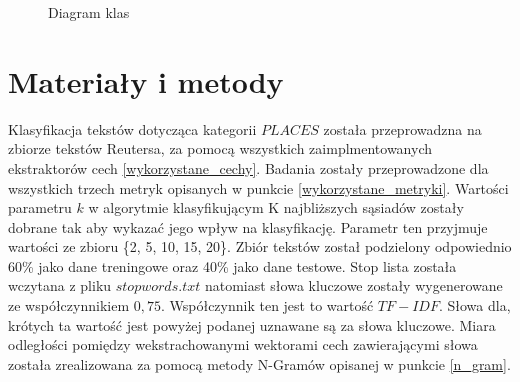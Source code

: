 \documentclass{classrep}
\begin{document}
\begin{figure}[h!]
    \centering
    \caption{Diagram klas}
    \label{fig:uml}
\end{figure}


\section{Materiały i metody}
Klasyfikacja tekstów dotycząca kategorii $PLACES$ została przeprowadzna na zbiorze tekstów Reutersa, za
pomocą wszystkich zaimplmentowanych ekstraktorów cech \ref{wykorzystane_cechy}. Badania zostały
przeprowadzone dla wszystkich trzech metryk opisanych w punkcie \ref{wykorzystane_metryki}. Wartości
parametru $k$ w algorytmie klasyfikującym K najbliższych sąsiadów zostały dobrane tak aby wykazać jego
wpływ na klasyfikację. Parametr ten przyjmuje wartości ze zbioru \{2, 5, 10, 15, 20\}. Zbiór tekstów
został podzielony odpowiednio 60\% jako dane treningowe oraz 40\% jako dane testowe. Stop lista została
wczytana z pliku $stopwords.txt$ natomiast słowa kluczowe zostały wygenerowane ze współczynnikiem $0,75$.
Współczynnik ten jest to wartość $TF-IDF$. Słowa dla, krótych ta wartość jest powyżej podanej uznawane
są za słowa kluczowe. Miara odległości pomiędzy wekstrachowanymi wektorami cech zawierającymi słowa
została zrealizowana za pomocą metody N-Gramów opisanej w punkcie \ref{n_gram}.
\end{document}
